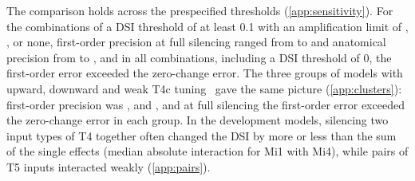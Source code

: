 The comparison holds across the prespecified thresholds (\cref{app:sensitivity}). For the \SensCombos{} combinations of a DSI threshold of at least 0.1 with an amplification limit of \AmpLimitLow{}, \AmpLimit{}, \AmpLimitHigh{} or none, first-order precision at full silencing ranged from \SensPrecFOMin{} to \SensPrecFOMax{} and anatomical precision from \SensPrecAnatMin{} to \SensPrecAnatMax{}, and in all \SensCombosAll{} combinations, including a DSI threshold of 0, the first-order error exceeded the zero-change error. The three groups of models with upward, downward and weak T4c tuning~\citep{lappalainen2024connectome} gave the same picture (\cref{app:clusters}): first-order precision was \ClusterUpPrec{}, \ClusterDownPrec{} and \ClusterWeakPrec{}, and at full silencing the first-order error exceeded the zero-change error in each group. In the development models, silencing two input types of T4 together often changed the DSI by more or less than the sum of the single effects (median absolute interaction \PairMiOneMiFourDSI{} for Mi1 with Mi4), while pairs of T5 inputs interacted weakly (\cref{app:pairs}).
